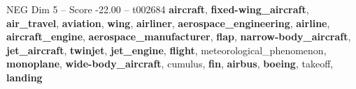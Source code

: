 \begin{textsample}{NEG Dim 5 – Score -22.00 – t002684}  \label{ex:f5_neg_008}
\textbf{aircraft}, \textbf{fixed-wing\_aircraft}, \textbf{air\_travel}, \textbf{aviation}, \textbf{wing}, \textbf{airliner}, \textbf{aerospace\_engineering}, \textbf{airline}, \textbf{aircraft\_engine}, \textbf{aerospace\_manufacturer}, \textbf{flap}, \textbf{narrow-body\_aircraft}, \textbf{jet\_aircraft}, \textbf{twinjet}, \textbf{jet\_engine}, \textbf{flight}, meteorological\_phenomenon, \textbf{monoplane}, \textbf{wide-body\_aircraft}, cumulus, \textbf{fin}, \textbf{airbus}, \textbf{boeing}, takeoff, \textbf{landing}

\end{textsample}
